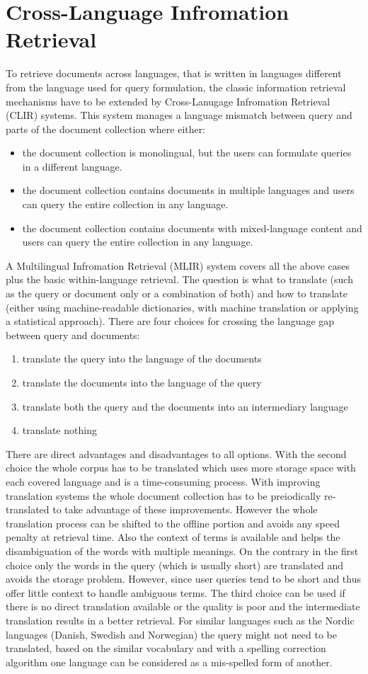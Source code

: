 \documentclass[journal]{IEEEtran}
\begin{document}
\section{Cross-Language Infromation Retrieval}
To retrieve documents across languages, that is written in languages different from the language used for query formulation, the classic information retrieval mechanisms have to be extended by Cross-Lanugage Infromation Retrieval (CLIR) systems.
This system manages a language mismatch between query and parts of the document collection where either:
\begin{itemize}
	\item the document collection is monolingual, but the users can formulate queries in a different language.
	\item the document collection contains documents in multiple languages and users can query the entire collection in any language.
	\item the document collection contains documents with mixed-language content and users can query the entire collection in any language.
\end{itemize}
A Multilingual Infromation Retrieval (MLIR) system covers all the above cases plus the basic within-language retrieval.
The question is what to translate (such as the query or document only or a combination of both) and how to translate (either using machine-readable dictionaries, with machine translation or applying a statistical approach).
There are four choices for crossing the language gap between query and documents:
\begin{enumerate}
	\item translate the query into the language of the documents
	\item translate the documents into the language of the query
	\item translate both the query and the documents into an intermediary language
	\item translate nothing
\end{enumerate}
There are direct advantages and disadvantages to all options.
With the second choice the whole corpus has to be translated which uses more storage space with each covered language and is a time-consuming process.
With improving translation systems the whole document collection has to be preiodically re-translated to take advantage of these improvements.
However the whole translation process can be shifted to the offline portion and avoids any speed penalty at retrieval time.
Also the context of terms is available and helps the disambiguation of the words with multiple meanings.
On the contrary in the first choice only the words in the query (which is usually short) are translated and avoids the storage problem.
However, since user queries tend to be short and thus offer little context to handle ambiguous terms.
The third choice can be used if there is no direct translation available or the quality is poor and the intermediate translation results in a better retrieval.
For similar languages such as the Nordic languages (Danish, Swedish and Norwegian) the query might not need to be translated, based on the similar vocabulary and with a spelling correction algorithm one language can be considered as a mis-spelled form of another.
\end{document}
